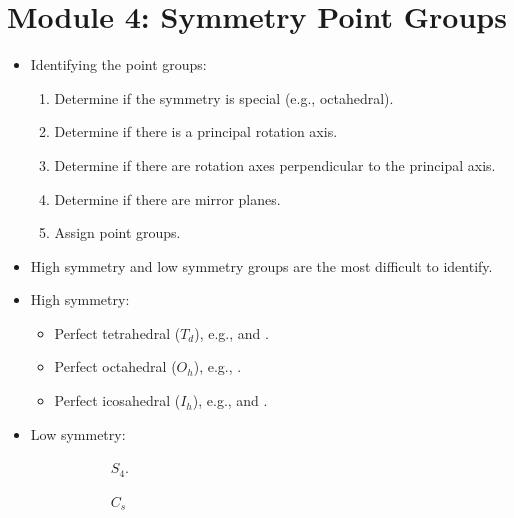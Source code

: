 \documentclass[../notes.tex]{subfiles}
\begin{document}
\section{Module 4: Symmetry Point Groups}
\begin{itemize}
    \item Identifying the point groups:
    \begin{enumerate}
        \item Determine if the symmetry is special (e.g., octahedral).
        \item Determine if there is a principal rotation axis.
        \item Determine if there are rotation axes perpendicular to the principal axis.
        \item Determine if there are mirror planes.
        \item Assign point groups.
    \end{enumerate}
    \item High symmetry and low symmetry groups are the most difficult to identify.
    \item High symmetry:
    \begin{itemize}
        \item Perfect tetrahedral ($T_d$), e.g.,  and .
        \item Perfect octahedral ($O_h$), e.g., .
        \item Perfect icosahedral ($I_h$), e.g.,  and .
    \end{itemize}
    \item Low symmetry:
    \begin{figure}[h!]
        \centering
        \begin{subfigure}[b]{0.24\linewidth}
            \centering
            \footnotesize
            \caption{$S_4$.}
            \label{fig:lowSymmetrya}
        \end{subfigure}
        \begin{subfigure}[b]{0.24\linewidth}
            \centering
            \footnotesize
            \caption{$C_s$}
            \label{fig:lowSymmetryb}
        \end{subfigure}
        \begin{subfigure}[b]{0.24\linewidth}
            \centering
            \footnotesize

\end{subfigure}
\end{figure}
\end{itemize}
\end{document}
